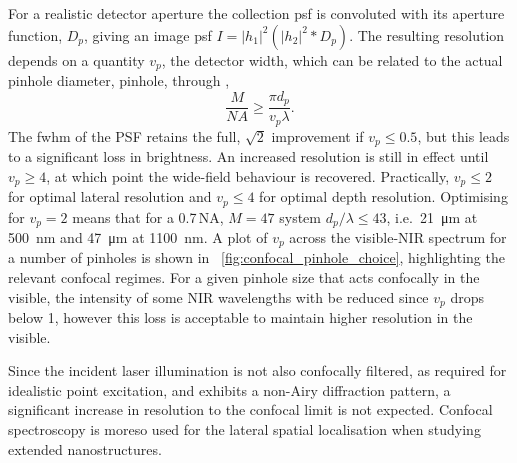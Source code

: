 \documentclass{article}
\begin{document}
For a realistic detector aperture the collection \gls{psf} is convoluted with its aperture function, $D_p$, giving an image \gls{psf} $I=|h_1|^2(|h_2|^2\ast D_p)$. The resulting resolution depends on a quantity $v_p$, the detector width, which can be related to the actual pinhole diameter, \gls{pinhole}, through \cite{wilson1987size},
\begin{equation}
	\frac{M}{\mathit{NA}}\geq\frac{\pi d_p}{v_p\lambda}.
\end{equation}
The \gls{fwhm} of the PSF retains the full, $\sqrt{2}$ improvement if $v_p\leq0.5$, but this leads to a significant loss in brightness. An increased resolution is still in effect until $v_p\geq4$, at which point the wide-field behaviour is recovered. Practically, $v_p\leq2$ for optimal lateral resolution and $v_p\leq4$ for optimal depth resolution. Optimising for $v_p=2$ means that for a 0.7\,NA, $M=47$ system $d_p/\lambda\leq43$, i.e.\ \SI{21}{\micro\metre} at \SI{500}{nm} and \SI{47}{\micro\metre} at \SI{1100}{nm}. A plot of $v_p$ across the visible-NIR spectrum for a number of pinholes is shown in \figurename~\ref{fig:confocal_pinhole_choice}, highlighting the relevant confocal regimes. For a given pinhole size that acts confocally in the visible, the intensity of some NIR wavelengths with be reduced since $v_p$ drops below 1, however this loss is acceptable to maintain higher resolution in the visible.

Since the incident laser illumination is not also confocally filtered, as required for idealistic point excitation, and exhibits a non-Airy diffraction pattern, a significant increase in resolution to the confocal limit is not expected. Confocal spectroscopy is moreso used for the lateral spatial localisation when studying extended nanostructures. %
\end{document}
